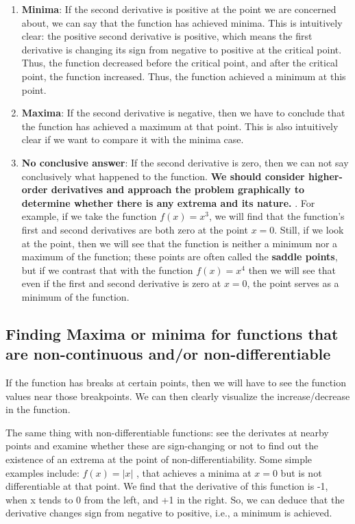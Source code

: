 \begin{enumerate}
    \item \textbf{Minima}: If the second derivative is positive at the point we are concerned about, we can say that the function has achieved minima. This is intuitively clear: the positive second derivative is positive, which means the first derivative is changing its sign from negative to positive at the critical point. Thus, the function decreased before the critical point, and after the critical point, the function increased. Thus, the function achieved a minimum at this point. 
    \item \textbf{Maxima}: If the second derivative is negative, then we have to conclude that the function has achieved a maximum at that point. This is also intuitively clear if we want to compare it with the minima case. 
    \item \textbf{No conclusive answer}: If the second derivative is zero, then we can not say conclusively what happened to the function. \textbf{We should consider higher-order derivatives and approach the problem graphically to determine whether there is any extrema and its nature. 
}.
For example, if we take the function $f(x)=x^3$, we will find that the function's first and second derivatives are both zero at the point $x=0$. Still, if we look at the point, then we will see that the function is neither a minimum nor a maximum of the function; these points are often called the \textbf{saddle points}, but if we contrast that with the function $f(x)=x^4$ then we will see that even if the first and second derivative is zero at $x=0$, the point serves as a minimum of the function. 
\end{enumerate}

\subsection{Finding Maxima or minima for functions that are non-continuous and/or non-differentiable}

If the function has breaks at certain points, then we will have to see the function values near those breakpoints. We can then clearly visualize the increase/decrease in the function. 

The same thing with non-differentiable functions: see the derivates at nearby points and examine whether these are sign-changing or not to find out the existence of an extrema at the point of non-differentiability. Some simple examples include: $f(x)=|x|$
, that achieves a minima at $x=0$ but is not differentiable at that point. We find that the derivative of this function is -1, when x tends to 0 from the left, and +1 in the right. So, we can deduce that the derivative changes sign from negative to positive, i.e., a minimum is achieved.

